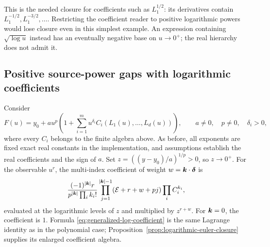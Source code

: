 This is the needed closure for coefficients such as $L_1^{1/2}$:
its derivatives contain $L_1^{-1/2},L_1^{-3/2},\ldots$.
Restricting the coefficient reader to positive logarithmic powers would
lose closure even in this simplest example. An expression containing
$\sqrt{\log u}$ instead has an eventually negative base on $u\to0^+$;
the real hierarchy does not admit it.

\subsection{Positive source-power gaps with logarithmic coefficients}

Consider
\begin{equation}
 F(u)=y_0+a u^p\left(1+\sum_{i=1}^m
 u^{\delta_i}C_i(L_1(u),\ldots,L_d(u))\right),
 \qquad a\ne0,\quad p\ne0,\quad \delta_i>0,
 \label{eq:generalized-log-forward}
\end{equation}
where every $C_i$ belongs to the finite algebra above. As before, all
exponents are fixed exact real constants in the implementation, and
assumptions establish the real coefficients and the sign of $a$.
Set $z=((y-y_0)/a)^{1/p}>0$, so $z\to0^+$. For the observable $u^r$, the
multi-index coefficient of weight $w=\boldsymbol k\cdot\boldsymbol\delta$ is
\begin{equation}
 \frac{(-1)^{|\boldsymbol k|}r}{p^{|\boldsymbol k|}\prod_i k_i!}
 \prod_{j=1}^{|\boldsymbol k|-1}(\mathcal E+r+w+pj)
 \prod_i C_i^{k_i},
 \label{eq:generalized-log-coefficient}
\end{equation}
evaluated at the logarithmic levels of $z$ and multiplied by $z^{r+w}$.
For $\boldsymbol k=0$, the coefficient is $1$. Formula
\eqref{eq:generalized-log-coefficient} is the same Lagrange identity as
in the polynomial case; Proposition~\ref{prop:logarithmic-euler-closure}
supplies its enlarged coefficient algebra.


